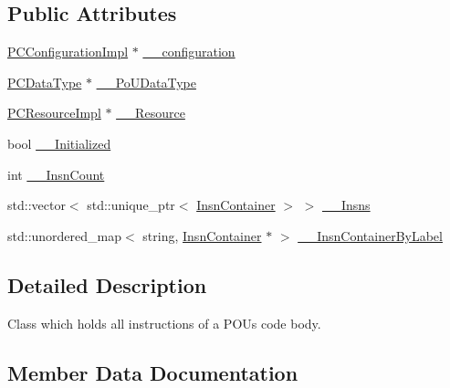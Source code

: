 \subsection*{Public Attributes}
\begin{DoxyCompactItemize}
\item 
\hyperlink{classpc__emulator_1_1PCConfigurationImpl}{P\+C\+Configuration\+Impl} $\ast$ \hyperlink{classpc__emulator_1_1PoUCodeContainer_a148557c2b2cea42835df72bade8de647}{\+\_\+\+\_\+configuration}
\item 
\hyperlink{classpc__emulator_1_1PCDataType}{P\+C\+Data\+Type} $\ast$ \hyperlink{classpc__emulator_1_1PoUCodeContainer_a99ec39aa050f16be539dd318f7484ba0}{\+\_\+\+\_\+\+Po\+U\+Data\+Type}
\item 
\hyperlink{classpc__emulator_1_1PCResourceImpl}{P\+C\+Resource\+Impl} $\ast$ \hyperlink{classpc__emulator_1_1PoUCodeContainer_a9770310f0434d5898949531307d6acbb}{\+\_\+\+\_\+\+Resource}
\item 
bool \hyperlink{classpc__emulator_1_1PoUCodeContainer_a27bd5fec4acbe018dc5b2d0628c3961a}{\+\_\+\+\_\+\+Initialized}
\item 
int \hyperlink{classpc__emulator_1_1PoUCodeContainer_a9cbc804c2057ce5c717b3af07bc4cea6}{\+\_\+\+\_\+\+Insn\+Count}
\item 
std\+::vector$<$ std\+::unique\+\_\+ptr$<$ \hyperlink{classpc__emulator_1_1InsnContainer}{Insn\+Container} $>$ $>$ \hyperlink{classpc__emulator_1_1PoUCodeContainer_abf911d123b0145553af13b7d01a9b172}{\+\_\+\+\_\+\+Insns}
\item 
std\+::unordered\+\_\+map$<$ string, \hyperlink{classpc__emulator_1_1InsnContainer}{Insn\+Container} $\ast$ $>$ \hyperlink{classpc__emulator_1_1PoUCodeContainer_a6417c381b46c8c514a873edab795b36a}{\+\_\+\+\_\+\+Insn\+Container\+By\+Label}
\end{DoxyCompactItemize}


\subsection{Detailed Description}
Class which holds all instructions of a P\+OU\textquotesingle{}s code body. 

\subsection{Member Data Documentation}
